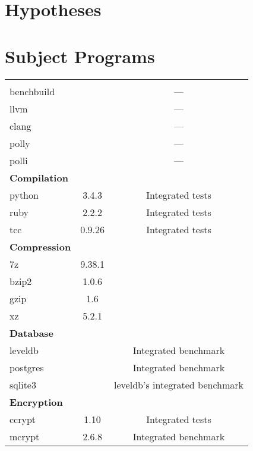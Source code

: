 \section{Hypotheses}

\section{Subject Programs}
\begin{table}[H]
    \myfloatalign
    \begin{tabularx}{\textwidth}{lcC} \toprule
         &  & \\
        \midrule
        \\
        benchbuild &  & ---\\
        llvm &  & ---\\
        clang &  & ---\\
        polly &  & ---\\
        polli &  & ---\\
        \midrule
        \textbf{Compilation}\\
        python & 3.4.3 & Integrated tests\\
        ruby & 2.2.2 & Integrated tests\\
        tcc & 0.9.26 & Integrated tests\\
        \midrule
        \textbf{Compression}\\
        7z & 9.38.1 & \\
        bzip2 & 1.0.6 & \\
        gzip & 1.6 & \\
        xz & 5.2.1 & \\
        \midrule
        \textbf{Database}\\
        leveldb &  & Integrated benchmark\\
        postgres & & Integrated benchmark\\
        sqlite3 &  & leveldb's integrated benchmark\\
        \midrule
        \textbf{Encryption}\\
        ccrypt & 1.10 & Integrated tests\\
        mcrypt & 2.6.8 & Integrated benchmark\\

\end{tabularx}
\end{table}
